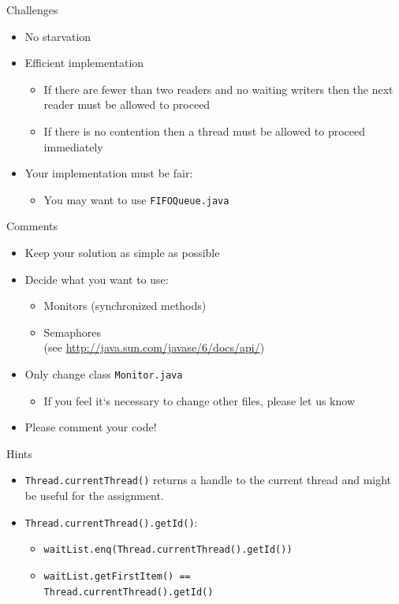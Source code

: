 \begin{frame}{Challenges}
  \begin{itemize}
  \item No starvation
  \item Efficient implementation
    \begin{itemize}
    \item If there are fewer than two readers and no waiting writers
      then the next reader must be allowed to proceed
    \item If there is no contention then a thread must be allowed to
      proceed immediately
    \end{itemize}
  \item Your implementation must be fair:
    \begin{itemize}
    \item You may want to use \lstinline!FIFOQueue.java!
    \end{itemize}
  \end{itemize}
\end{frame}

\begin{frame}{Comments}
  \begin{itemize}
  \item Keep your solution as simple as possible
  \item Decide what you want to use:
    \begin{itemize}
    \item Monitors (synchronized methods)
    \item Semaphores \\
      (see \url{http://java.sun.com/javase/6/docs/api/})
    \end{itemize}
  \item Only change class \lstinline!Monitor.java!
    \begin{itemize}
    \item If you feel it‘s necessary to change other files, please let
      us know
    \end{itemize}
  \item Please comment your code!
  \end{itemize}
\end{frame}

\begin{frame}{Hints}
  \begin{itemize}
  \item \lstinline!Thread.currentThread()! returns a handle to the
    current thread and might be useful for the assignment.
  \item \lstinline!Thread.currentThread().getId()!:
    \begin{itemize}
    \item \lstinline!waitList.enq(Thread.currentThread().getId())!
    \item \lstinline!waitList.getFirstItem() == !\\
      \lstinline!Thread.currentThread().getId()!
    \end{itemize}
  \end{itemize}
\end{frame}


